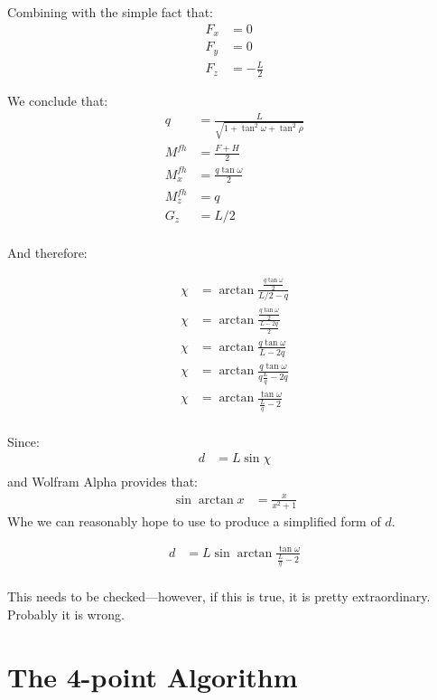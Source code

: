 \documentclass[11pt]{article}
\begin{document}
{Combining with the simple fact that:
\begin{align}
  F_x &= 0 \\
  F_y &= 0  \\
  F_z &= - \frac{L}{2}
\end{align}

We conclude that:
\begin{align}
  q &= \frac{L}{\sqrt{1 + \tan^2{\omega} + \tan^2{\rho}}}  \\  
  M^{fh} &= \frac{F + H}{2} \\
  M^{fh}_x &= \frac{q \tan{\omega}}{2} \\
  M^{fh}_z &= q \\
  G_z &= L/2 \\
\end{align}

And therefore:

\begin{align}
  \chi &= \arctan{\frac{\frac{q \tan{\omega}}{2}}{L/2 - q}} \\
  \chi &= \arctan{\frac{\frac{q \tan{\omega}}{2}}{\frac{L - 2q}{2}}} \\
  \chi &= \arctan{\frac{q \tan{\omega}}{L - 2q}} \\
  \chi &= \arctan{\frac{q \tan{\omega}}{q\frac{L}{q} - 2q}} \\
  \chi &= \arctan{\frac{ \tan{\omega}}{\frac{L}{q} - 2}} \\
\end{align}

Since:
\begin{align}
  d &= L \sin{\chi} \\
\end{align}
and Wolfram Alpha provides that:
\begin{align}
  \sin{\arctan{x}} &= \frac{x}{x^2 + 1}
\end{align}
Whe we can reasonably hope to use to produce a simplified form of
$d$.

\begin{align}
  d  &= L \sin{\arctan{\frac{ \tan{\omega}}{\frac{L}{q} - 2}}} \\  
\end{align}

This needs to be checked---however, if this is true, it is pretty
extraordinary. Probably it is wrong.

\section{The 4-point Algorithm}

}
\end{document}
